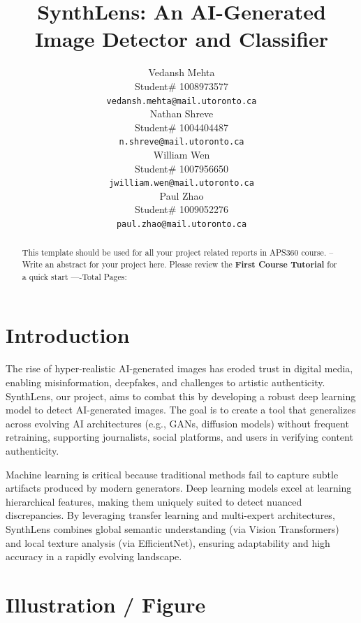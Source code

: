 \documentclass{article} %
\title{SynthLens: An AI-Generated Image Detector and Classifier}
\author{Vedansh Mehta  \\
Student\# 1008973577 \\
\texttt{vedansh.mehta@mail.utoronto.ca} \\
\And
Nathan Shreve  \\
Student\# 1004404487 \\
\texttt{n.shreve@mail.utoronto.ca} \\
\AND
William Wen  \\
Student\# 1007956650 \\
\texttt{jwilliam.wen@mail.utoronto.ca} \\
\And
Paul Zhao \\
Student\# 1009052276 \\
\texttt{paul.zhao@mail.utoronto.ca} \\
\AND
}
\begin{document}
\maketitle

\begin{abstract}
    This template should be used for all your project related reports in APS360 course. -- Write an abstract for your project here. Please review the \textbf{ First Course Tutorial} for a quick start
    ----Total Pages: \pageref{last_page}
\end{abstract}



\section{Introduction}
The rise of hyper-realistic AI-generated images has eroded trust in digital media, enabling misinformation, deepfakes, and challenges to artistic authenticity. SynthLens, our project, aims to combat this by developing a robust deep learning model to detect AI-generated images. The goal is to create a tool that generalizes across evolving AI architectures (e.g., GANs, diffusion models) without frequent retraining, supporting journalists, social platforms, and users in verifying content authenticity.

Machine learning is critical because traditional methods fail to capture subtle artifacts produced by modern generators. Deep learning models excel at learning hierarchical features, making them uniquely suited to detect nuanced discrepancies. By leveraging transfer learning and multi-expert architectures, SynthLens combines global semantic understanding (via Vision Transformers) and local texture analysis (via EfficientNet), ensuring adaptability and high accuracy in a rapidly evolving landscape.

\section{Illustration / Figure}
\end{document}
